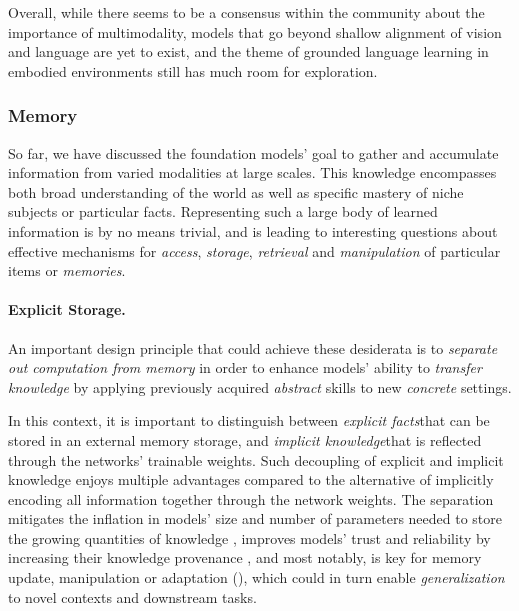 Overall, while there seems to be a consensus within the community about the importance of multimodality, models that go beyond shallow alignment of vision and language are yet to exist, and the theme of grounded language learning in embodied environments still has much room for exploration.


\subsubsection{Memory} 
\label{sec:modeling-memory}
So far, we have discussed the  foundation models' goal to gather and accumulate information from varied modalities at large scales. This knowledge encompasses both broad understanding of the world as well as specific mastery of niche subjects or particular facts. Representing such a large body of learned information is by no means trivial, and is leading to interesting questions about effective mechanisms for \textit{access}, \textit{storage}, \textit{retrieval} and \textit{manipulation} of particular items or \textit{memories}.

\paragraph{Explicit Storage.} An important design principle that could achieve these desiderata is to \textit{separate out \textit{computation} from \textit{memory}} \citep{Weston2015MemoryN,dnc,mac,nsm} in order to enhance models' ability to \textit{transfer knowledge} by applying previously acquired \textit{abstract} skills to new \textit{concrete} settings. 

In this context, it is important to distinguish between \textit{explicit facts}\dash{}that can be stored in an external memory storage, and \textit{implicit knowledge}\dash{}that is reflected through the networks' trainable weights. Such decoupling of explicit and implicit knowledge enjoys multiple advantages compared to the alternative of implicitly encoding all information together through the network weights. The separation mitigates the inflation in models' size and number of parameters needed to store the growing quantities of knowledge \citep{guu2020realm}, improves models' trust and reliability by increasing their knowledge provenance \citep{cheney2009provenance}, and most notably, is key for memory update, manipulation or adaptation \citep{lewis2020retrieval} (), which could in turn enable \textit{generalization} to novel contexts and downstream tasks. 

